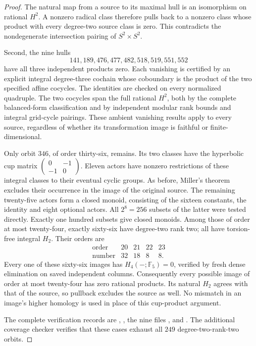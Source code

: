 \begin{proof}
The natural map from a source to its maximal hull is an isomorphism
on rational $H^2$.  A nonzero radical class therefore pulls back to
a nonzero class whose product with every degree-two source class
is zero.  This contradicts the nondegenerate intersection pairing
of $S^2\times S^2$.

Second, the nine hulls
\[
 141,189,476,477,482,518,519,551,552
\]
have all three independent products zero.  Each vanishing is
certified by an explicit integral degree-three cochain whose
coboundary is the product of the two specified affine cocycles.
The identities are checked on every normalized quadruple.
The two cocycles span the full rational $H^2$, both by the complete
balanced-form classification and by independent modular rank bounds
and integral grid-cycle pairings.  These ambient vanishing results
apply to every source, regardless of whether its transformation
image is faithful or finite-dimensional.

Only orbit $346$, of order thirty-six, remains.  Its two classes
have the hyperbolic cup matrix
$\left(\begin{smallmatrix}0&-1\\-1&0\end{smallmatrix}\right)$.
Eleven actors have nonzero restrictions of these integral classes
to their eventual cyclic groups.  As before, Miller's theorem
excludes their occurrence in the image of the original source.
The remaining twenty-five actors form a closed monoid, consisting
of the sixteen constants, the identity and eight optional actors.
All $2^8=256$ subsets of the latter were tested directly.
Exactly one hundred subsets give closed monoids.  Among those of
order at most twenty-four, exactly sixty-six have degree-two rank
two; all have torsion-free integral $H_2$.  Their orders are
\[
\begin{array}{c|rrrr}
\text{order}&20&21&22&23\\\hline
\text{number}&32&18&8&8.
\end{array}
\]
Every one of these sixty-six images has
$H_4(-;\mathbb F_5)=0$, verified by fresh dense elimination
on saved independent columns.  Consequently every possible image
of order at most twenty-four has zero rational products.  Its
natural $H_2$ agrees with that of the source, so pullback excludes
the source as well.  No mismatch in an image's higher homology
is used in place of this cup-product argument.

The complete verification records are
,
,
the nine files ,
and .
The additional coverage checker verifies that these cases exhaust
all $249$ degree-two-rank-two orbits.
\end{proof}

